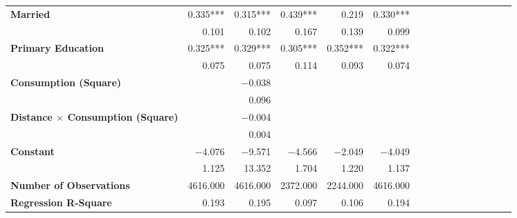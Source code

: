 \begin{tabular}{@{\extracolsep{5pt}}lrrrrrrrrrrrrrrr}
{\bf Married} & 0.335\phantom{)}*** & 0.315\phantom{)}*** & 0.439\phantom{)}*** & 0.219\phantom{\phantom{)}***} & 0.330\phantom{)}*** \\
{\bf } & 0.101\phantom{\phantom{)}***} & 0.102\phantom{\phantom{)}***} & 0.167\phantom{\phantom{)}***} & 0.139\phantom{\phantom{)}***} & 0.099\phantom{\phantom{)}***} \\
{\bf Primary Education} & 0.325\phantom{)}*** & 0.329\phantom{)}*** & 0.305\phantom{)}*** & 0.352\phantom{)}*** & 0.322\phantom{)}*** \\
{\bf } & 0.075\phantom{\phantom{)}***} & 0.075\phantom{\phantom{)}***} & 0.114\phantom{\phantom{)}***} & 0.093\phantom{\phantom{)}***} & 0.074\phantom{\phantom{)}***} \\
{\bf Consumption (Square)} & \phantom{***} & $-$0.038\phantom{\phantom{)}***} & \phantom{***} & \phantom{***} & \phantom{***} \\
{\bf } & \phantom{***} & 0.096\phantom{\phantom{)}***} & \phantom{***} & \phantom{***} & \phantom{***} \\
{\bf Distance $\times$ Consumption (Square)} & \phantom{***} & $-$0.004\phantom{\phantom{)}***} & \phantom{***} & \phantom{***} & \phantom{***} \\
{\bf } & \phantom{***} & 0.004\phantom{\phantom{)}***} & \phantom{***} & \phantom{***} & \phantom{***} \\
{\bf Constant} & $-$4.076\phantom{\phantom{)}***} & $-$9.571\phantom{\phantom{)}***} & $-$4.566\phantom{\phantom{)}***} & $-$2.049\phantom{\phantom{)}***} & $-$4.049\phantom{\phantom{)}***} \\
{\bf } & 1.125\phantom{\phantom{)}***} & 13.352\phantom{\phantom{)}***} & 1.704\phantom{\phantom{)}***} & 1.220\phantom{\phantom{)}***} & 1.137\phantom{\phantom{)}***} \\
{\bf Number of Observations} & 4616.000\phantom{\phantom{)}***} & 4616.000\phantom{\phantom{)}***} & 2372.000\phantom{\phantom{)}***} & 2244.000\phantom{\phantom{)}***} & 4616.000\phantom{\phantom{)}***} \\
{\bf Regression R-Square} & 0.193\phantom{***} & 0.195\phantom{***} & 0.097\phantom{***} & 0.106\phantom{***} & 0.194\phantom{***} \\
\hline
\end{tabular}
